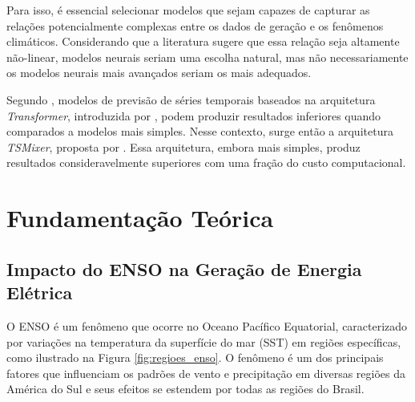 Para isso, é essencial selecionar modelos que sejam capazes de capturar as relações potencialmente complexas entre os
dados de geração e os fenômenos climáticos. Considerando que a literatura sugere que essa relação seja altamente não-linear,
modelos neurais seriam uma escolha natural, mas não necessariamente os modelos neurais mais avançados seriam os mais adequados.

Segundo , modelos de previsão de séries temporais baseados na arquitetura \textit{Transformer}, introduzida 
por , podem produzir resultados inferiores quando comparados a modelos mais simples. Nesse contexto,
surge então a arquitetura \textit{TSMixer}, proposta por . Essa arquitetura, embora mais simples, produz resultados 
consideravelmente superiores com uma fração do custo computacional. 


\chapter{Fundamentação Teórica}
\section{Impacto do ENSO na Geração de Energia Elétrica}
O ENSO é um fenômeno que ocorre no Oceano Pacífico Equatorial, caracterizado por variações na temperatura da superfície
do mar (SST) em regiões específicas, como ilustrado na Figura \ref{fig:regioes_enso}. O fenômeno é um dos principais fatores 
que influenciam os padrões de vento e precipitação em diversas regiões da América do Sul e seus efeitos se estendem por 
todas as regiões do Brasil. \cite{Andreoli2016}

\begin{figure}[!ht]
	{}
	{}
\end{figure}

